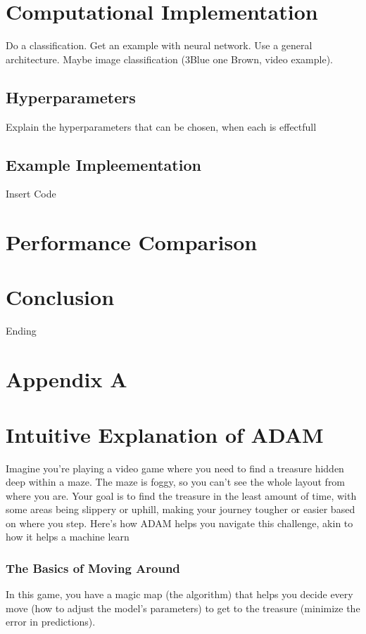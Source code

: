 \documentclass[journal]{IEEEtran}
\begin{document}
\section{Computational Implementation}
Do a classification.  
Get an example with neural network. Use a general architecture. Maybe image classification (3Blue one Brown, video example).
\subsection{Hyperparameters}
Explain the hyperparameters that can be chosen, when each is effectfull
\subsection{Example Impleementation}
Insert Code

\section{Performance Comparison}

 
\section{Conclusion}
Ending




\onecolumn
\newpage
\pagestyle{fancy}

\section{Appendix A}
\section*{Intuitive Explanation of ADAM}
Imagine you're playing a video game where you need to find a treasure hidden deep within a maze. The maze is foggy, so you can't see the whole layout from where you are. Your goal is to find the treasure in the least amount of time, with some areas being slippery or uphill, making your journey tougher or easier based on where you step. Here's how ADAM helps you navigate this challenge, akin to how it helps a machine learn

\subsubsection*{The Basics of Moving Around}
In this game, you have a magic map (the algorithm) that helps you decide every move (how to adjust the model's parameters) to get to the treasure (minimize the error in predictions).
\end{document}
